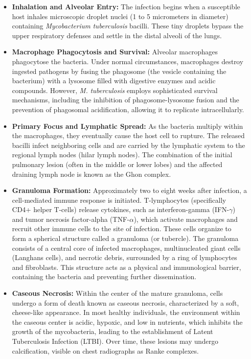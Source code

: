 \begin{itemize}
    \item \textbf{Inhalation and Alveolar Entry:} The infection begins when a susceptible host inhales microscopic droplet nuclei (1 to 5 micrometers in diameter) containing \textit{Mycobacterium tuberculosis} bacilli. These tiny droplets bypass the upper respiratory defenses and settle in the distal alveoli of the lungs.
    \item \textbf{Macrophage Phagocytosis and Survival:} Alveolar macrophages phagocytose the bacteria. Under normal circumstances, macrophages destroy ingested pathogens by fusing the phagosome (the vesicle containing the bacterium) with a lysosome filled with digestive enzymes and acidic compounds. However, \textit{M. tuberculosis} employs sophisticated survival mechanisms, including the inhibition of phagosome-lysosome fusion and the prevention of phagosomal acidification, allowing it to replicate intracellularly.
    \item \textbf{Primary Focus and Lymphatic Spread:} As the bacteria multiply within the macrophages, they eventually cause the host cell to rupture. The released bacilli infect neighboring cells and are carried by the lymphatic system to the regional lymph nodes (hilar lymph nodes). The combination of the initial pulmonary lesion (often in the middle or lower lobes) and the affected draining lymph node is known as the Ghon complex.
    \item \textbf{Granuloma Formation:} Approximately two to eight weeks after infection, a cell-mediated immune response is initiated. T-lymphocytes (specifically CD4+ helper T-cells) release cytokines, such as interferon-gamma (IFN-$\gamma$) and tumor necrosis factor-alpha (TNF-$\alpha$), which activate macrophages and recruit other immune cells to the site of infection. These cells organize to form a spherical structure called a granuloma (or tubercle). The granuloma consists of a central core of infected macrophages, multinucleated giant cells (Langhans cells), and necrotic debris, surrounded by a ring of lymphocytes and fibroblasts. This structure acts as a physical and immunological barrier, containing the bacteria and preventing further dissemination.
    \item \textbf{Caseous Necrosis:} Within the center of the mature granuloma, cells undergo a form of death known as caseous necrosis, characterized by a soft, cheese-like appearance. In most healthy individuals, the environment within the caseous center is acidic, hypoxic, and low in nutrients, which inhibits the growth of the mycobacteria, leading to the establishment of Latent Tuberculosis Infection (LTBI). Over time, these lesions may undergo calcification, visible on chest radiographs as Ranke complexes.

\end{itemize}
